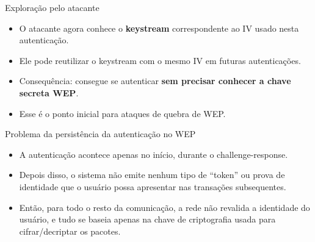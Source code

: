 \begin{frame}{Exploração pelo atacante}


    \begin{itemize}
        \item O atacante agora conhece o \textbf{keystream} correspondente ao IV usado nesta autenticação.
        \item Ele pode reutilizar o keystream com o mesmo IV em futuras autenticações.
        \item Consequência: consegue se autenticar \textbf{sem precisar conhecer a chave secreta WEP}.
        \item Esse é o ponto inicial para ataques de quebra de WEP.

    \end{itemize}
\end{frame}


\begin{frame}{Problema da persistência da autenticação no WEP}
    \begin{itemize}




        \item A autenticação acontece apenas no início, durante o challenge-response.



        \item Depois disso, o sistema não emite nenhum tipo de “token” ou prova de identidade que o usuário possa apresentar nas transações subsequentes.

        \item Então, para todo o resto da comunicação, a rede não revalida a identidade do usuário, e tudo se baseia apenas na chave de criptografia usada para cifrar/decriptar os pacotes.
    \end{itemize}
\end{frame}

